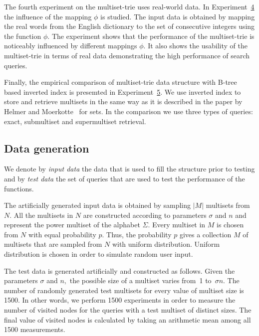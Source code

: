 The fourth experiment on the multiset-trie uses real-world data. In 
Experiment~\hyperref[s:exp4]{4} the influence of the mapping $\phi$ is studied. 
The input data is obtained by mapping the real words from the English dictionary 
to the set of consecutive integers using the function $\phi.$ The experiment 
shows that the performance of the multiset-trie is noticeably influenced by 
different mappings $\phi.$ It also shows the usability of the multiset-trie in terms 
of real data demonstrating the high performance of search queries.

Finally, the empirical comparison of multiset-trie data structure with
B-tree based inverted index is presemted in Experiment~\hyperref[s:exp5]{5}. We use
inverted index to store and retrieve multisets in the same way as it
is described in the paper by Helmer and Moerkotte~\cite{Helmer2003}
for sets. In the comparison we use three types of queries: exact,
submultiset and supermultiset retrieval.

\subsection*{Data generation}
We denote by \emph{input data} the data that is used to fill the structure prior 
to testing and by \emph{test data} the set of queries that are used to test the 
performance of the functions.

The artificially generated input data is obtained by sampling $|M|$ multisets 
from $N.$ All the multisets in $N$ are constructed according to parameters 
$\sigma$ and $n$ and represent the power multiset of the alphabet $\Sigma.$ 
Every multiset in $M$ is chosen from $N$ with equal probability $p.$ Thus, the 
probability $p$ gives a collection $M$ of multisets that are sampled from $N$ 
with uniform distribution. Uniform distribution is chosen in order to simulate
random user input.

The test data is generated artificially and constructed as follows. Given the 
parameters $\sigma$ and $n,$ the possible size of a multiset varies from~1 
to~$\sigma n.$ The number of randomly generated test multisets for every 
value of multiset size is 1500. In other words, we perform 1500 experiments 
in order to measure the number of visited nodes for the queries with a test multiset 
of distinct sizes. The final value of visited nodes is calculated by taking an 
arithmetic mean among all 1500 measurements.


